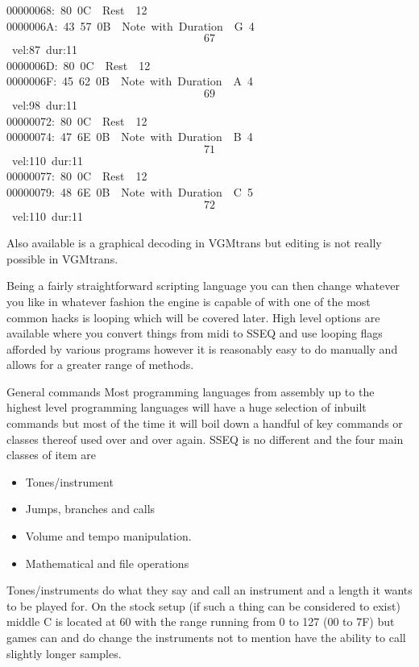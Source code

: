 \documentclass[
]{book}
\providecommand{\tightlist}{%
  \setlength{\itemsep}{0pt}\setlength{\parskip}{0pt}}
\begin{document}
00000068:~80~0C~\textbar~Rest~\textbar~12\\
0000006A:~43~57~0B~\textbar~Note~with~Duration~\textbar~G~4~\[67\]~vel:87~dur:11\\
0000006D:~80~0C~\textbar~Rest~\textbar~12\\
0000006F:~45~62~0B~\textbar~Note~with~Duration~\textbar~A~4~\[69\]~vel:98~dur:11\\
00000072:~80~0C~\textbar~Rest~\textbar~12\\
00000074:~47~6E~0B~\textbar~Note~with~Duration~\textbar~B~4~\[71\]~vel:110~dur:11\\
00000077:~80~0C~\textbar~Rest~\textbar~12\\
00000079:~48~6E~0B~\textbar~Note~with~Duration~\textbar~C~5~\[72\]~vel:110~dur:11

Also available is a graphical decoding in VGMtrans but editing is not really possible in VGMtrans.

Being a fairly straightforward scripting language you can then change whatever you like in whatever fashion the engine is capable of with one of the most common hacks is looping which will be covered later. High level options are available where you convert things from midi to SSEQ and use looping flags afforded by various programs however it is reasonably easy to do manually and allows for a greater range of methods.

General commands Most programming languages from assembly up to the highest level programming languages will have a huge selection of inbuilt commands but most of the time it will boil down a handful of key commands or classes thereof used over and over again. SSEQ is no different and the four main classes of item are

\begin{itemize}
\tightlist
\item
  Tones/instrument
\item
  Jumps, branches and calls
\item
  Volume and tempo manipulation.
\item
  Mathematical and file operations
\end{itemize}

Tones/instruments do what they say and call an instrument and a length it wants to be played for. On the stock setup (if such a thing can be considered to exist) middle C is located at 60 with the range running from 0 to 127 (00 to 7F) but games can and do change the instruments not to mention have the ability to call slightly longer samples.
\end{document}
